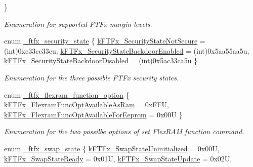 \begin{DoxyCompactItemize}
 \}
\begin{DoxyCompactList}\small\item\em Enumeration for supported F\+T\+Fx margin levels. \end{DoxyCompactList}\item 
enum \mbox{\hyperlink{group__ftfx__controller_ga0b42dbcfacb9ac0da48c674dd6a35f2f}{\+\_\+ftfx\+\_\+security\+\_\+state}} \{ \mbox{\hyperlink{group__ftfx__controller_gga0b42dbcfacb9ac0da48c674dd6a35f2faad4b024453fd82cbe1a9d1e88dbf8de6}{k\+F\+T\+Fx\+\_\+\+Security\+State\+Not\+Secure}} = (int)0xc33cc33cu, 
\mbox{\hyperlink{group__ftfx__controller_gga0b42dbcfacb9ac0da48c674dd6a35f2fa0202890ba1a235ac1ae5778b17fbe17e}{k\+F\+T\+Fx\+\_\+\+Security\+State\+Backdoor\+Enabled}} = (int)0x5aa55aa5u, 
\mbox{\hyperlink{group__ftfx__controller_gga0b42dbcfacb9ac0da48c674dd6a35f2fac12bd14b05350af1d1591a59d4cb6f38}{k\+F\+T\+Fx\+\_\+\+Security\+State\+Backdoor\+Disabled}} = (int)0x5ac33ca5u
 \}
\begin{DoxyCompactList}\small\item\em Enumeration for the three possible F\+T\+Fx security states. \end{DoxyCompactList}\item 
enum \mbox{\hyperlink{group__ftfx__controller_ga800c3413ac2380e1d63505c39eeec9b8}{\+\_\+ftfx\+\_\+flexram\+\_\+function\+\_\+option}} \{ \mbox{\hyperlink{group__ftfx__controller_gga800c3413ac2380e1d63505c39eeec9b8aa38f3e62b70126d0c91f582ec4f1277b}{k\+F\+T\+Fx\+\_\+\+Flexram\+Func\+Opt\+Available\+As\+Ram}} = 0x\+F\+FU, 
\mbox{\hyperlink{group__ftfx__controller_gga800c3413ac2380e1d63505c39eeec9b8a2fb1cb1b75bb3fb8380a4662bda0a60f}{k\+F\+T\+Fx\+\_\+\+Flexram\+Func\+Opt\+Available\+For\+Eeprom}} = 0x00U
 \}
\begin{DoxyCompactList}\small\item\em Enumeration for the two possilbe options of set Flex\+R\+AM function command. \end{DoxyCompactList}\item 
enum \mbox{\hyperlink{group__ftfx__controller_gac6715381632a07d502632b03f8cfb402}{\+\_\+ftfx\+\_\+swap\+\_\+state}} \{ \newline
\mbox{\hyperlink{group__ftfx__controller_ggac6715381632a07d502632b03f8cfb402a409faf74ea079fa19377acdea6997fd0}{k\+F\+T\+Fx\+\_\+\+Swap\+State\+Uninitialized}} = 0x00U, 
\mbox{\hyperlink{group__ftfx__controller_ggac6715381632a07d502632b03f8cfb402a2f001450d474547223903a9ffb81408f}{k\+F\+T\+Fx\+\_\+\+Swap\+State\+Ready}} = 0x01U, 
\mbox{\hyperlink{group__ftfx__controller_ggac6715381632a07d502632b03f8cfb402ab1537d0e7a41c61698dd6387424b73da}{k\+F\+T\+Fx\+\_\+\+Swap\+State\+Update}} = 0x02U, 

\end{DoxyCompactItemize}
